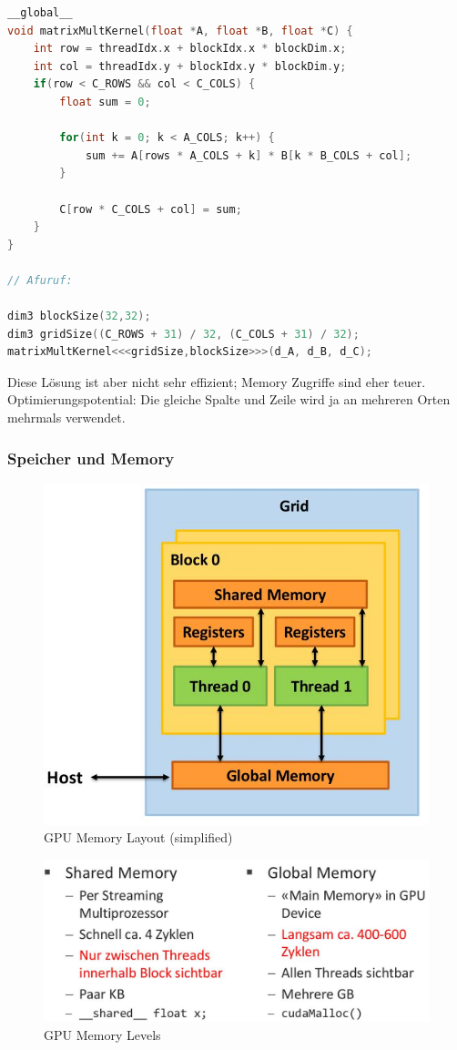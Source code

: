 \begin{lstlisting}[language=C]
__global__
void matrixMultKernel(float *A, float *B, float *C) {
	int row = threadIdx.x + blockIdx.x * blockDim.x;
	int col = threadIdx.y + blockIdx.y * blockDim.y;
	if(row < C_ROWS && col < C_COLS) {
		float sum = 0;
		
		for(int k = 0; k < A_COLS; k++) {
			sum += A[rows * A_COLS + k] * B[k * B_COLS + col];
		}
			
		C[row * C_COLS + col] = sum;
	}
}

// Afuruf:

dim3 blockSize(32,32);
dim3 gridSize((C_ROWS + 31) / 32, (C_COLS + 31) / 32);
matrixMultKernel<<<gridSize,blockSize>>>(d_A, d_B, d_C);
\end{lstlisting}

Diese Lösung ist aber nicht sehr effizient; Memory Zugriffe sind eher teuer. Optimierungspotential: Die gleiche Spalte und Zeile wird ja an mehreren Orten mehrmals verwendet.

\subsubsection{Speicher und Memory}

\begin{figure}[h]
	\centering
	\includegraphics[width=0.7\linewidth]{img/gpu_memory_simplified}
	\caption{GPU Memory Layout (simplified)}
	\label{fig:gpumemorysimplified}
\end{figure}

\begin{figure}[h]
	\centering
	\includegraphics[width=0.7\linewidth]{img/gpu_memory_levels}
	\caption{GPU Memory Levels}
	\label{fig:gpumemorylevels}
\end{figure}



